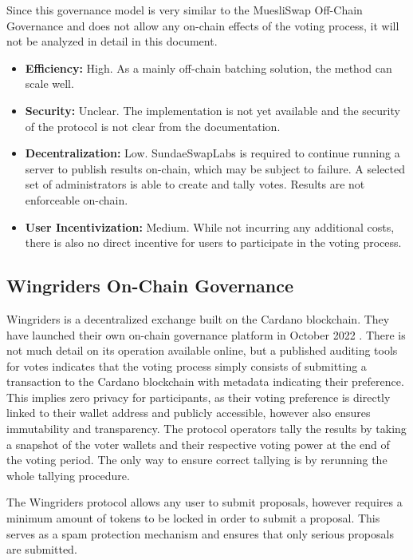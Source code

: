 \documentclass[11pt]{article}
\begin{document}
Since this governance model is very similar to the MuesliSwap Off-Chain Governance and does not allow
any on-chain effects of the voting process, it will not be analyzed in detail in this document.

\begin{itemize}
    \item \textbf{Efficiency:} High. As a mainly off-chain batching solution, the method can scale well.
    \item \textbf{Security:} Unclear. The implementation is not yet available and the security of the protocol is not clear from the documentation.
    \item \textbf{Decentralization:} Low. SundaeSwapLabs is required to continue running a server to publish results on-chain, which may be subject to failure. A selected set of administrators is able to create and tally votes. Results are not enforceable on-chain.
    \item \textbf{User Incentivization:} Medium. While not incurring any additional costs, there is also no direct incentive for users to participate in the voting process.
\end{itemize}

\subsection{Wingriders On-Chain Governance}

Wingriders is a decentralized exchange built on the Cardano blockchain.
They have launched their own on-chain governance platform in October 2022 \cite{wingriders-medium}.
There is not much detail on its operation available online, but a published auditing tools for votes
indicates that the voting process simply consists of submitting a transaction to the Cardano blockchain with metadata indicating their preference.
This implies zero privacy for participants, as their voting preference is directly linked to their wallet address and publicly accessible,
however also ensures immutability and transparency.
The protocol operators tally the results by taking a snapshot of the voter wallets and their respective voting power at the end of the voting period. \cite{wingriders-github}
The only way to ensure correct tallying is by rerunning the whole tallying procedure.

The Wingriders protocol allows any user to submit proposals,
however requires a minimum amount of tokens to be locked in order to submit a proposal.
This serves as a spam protection mechanism and ensures that only serious proposals are submitted.
\end{document}
